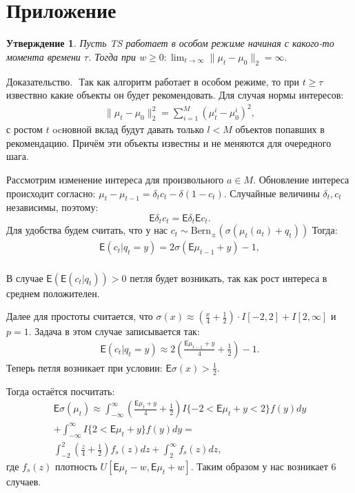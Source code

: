 \documentclass[12pt, twoside]{article}
\newtheorem{statement}{Утверждение}
\begin{document}
\section{Приложение}
\begin{statement}
  Пусть TS работает в особом режиме начиная с какого-то момента времени $\tau$. Тогда при $w \geq 0 : \lim_{t \to \infty} \|\mu_t - \mu_0 \|_2 = \infty.$
\end{statement}
$\textbf{Доказательство. }$ 
Так как алгоритм работает в особом режиме, то при $t \geq \tau$ извествно какие объекты он будет рекомендовать.
Для случая нормы интересов: 
\begin{gather*}
  \|\mu_t - \mu_0 \|^2_2 = \sum_{i=1}^M (\mu_t^i - \mu_0^i)^2,
\end{gather*}
с ростом $t$ ocновной вклад будут давать только $l < M$ объектов попавших в рекомендацию. 
Причём эти объекты известны и не меняются для очередного шага. 

Рассмотрим изменение интереса для произвольного $a \in M$. 
Обновление интереса происходит согласно: $\mu_t - \mu_{t-1} = \delta_t c_t - \delta (1 - c_t)$.
Случайные величины $\delta_t, c_t$ независимы, поэтому: \[\mathsf{E} \delta_t c_t = \mathsf{E} \delta_t \mathsf{E} c_t.\] 
Для удобства будем считать, что у нас $c_t \sim \text{Bern}_{\pm}(\sigma(\mu_t(a_t) + q_t))$
Тогда: 
\begin{gather*}
  \mathsf{E} (c_t |q_t = y) = 2 \sigma(\mathsf{E} \mu_{t-1} + y) - 1, \\
\end{gather*}

В случае $\mathsf{E}(\mathsf{E}(c_t|q_t)) > 0$ петля будет возникать, так как рост интереса в среднем положителен. 

Далее для простоты считается, что $\sigma(x) \approx \left(\frac{x}{4} + \frac{1}{2} \right) \cdot I[-2, 2] + I[2, \infty]$ и $p = 1$.
Задача в этом случае записывается так:
\begin{gather*}
  \mathsf{E} (c_t |q_t = y) \approx  2 \left(\frac{\mathsf{E} \mu_{t-1} + y}{4} + \frac{1}{2}\right) - 1.   
\end{gather*}
Теперь петля возникает при условии: $\mathsf{E}\sigma(x) > \frac{1}{2}$. 

Тогда остаётся посчитать:
\begin{gather*}
  \mathsf{E} \sigma(\mu_t) \approx \int_{-\infty}^{\infty} \left(\frac{\mathsf{E} \mu_t + y}{4} + \frac{1}{2} \right) I\{-2 < \mathsf{E}\mu_t +y < 2\} f(y)dy \\
  + \int_{-\infty}^{\infty} I\{2 < \mathsf{E}\mu_t +y \}f(y) dy = \\
  \int_{-2}^{2} \left(\frac{z}{4} + \frac{1}{2} \right) f_s(z)dz 
  + \int_{2}^{\infty} f_s(z) dz,
\end{gather*}
где $f_s(z)$ плотность $U[\mathsf{E}\mu_t - w, \mathsf{E}\mu_t + w]$.
Таким образом у нас возникает $6$ случаев.
\end{document}
